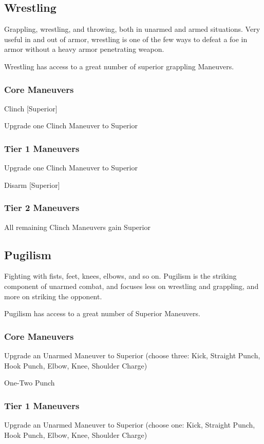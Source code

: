 \documentclass[oneside,11pt,english]{book}
\begin{document}
\subsection{Wrestling}
Grappling, wrestling, and throwing, both in unarmed and armed situations. Very useful in and out of 
armor, wrestling is one of the few ways to defeat a foe in armor without a heavy armor penetrating 
weapon.

Wrestling has access to a great number of superior grappling Maneuvers. 

\subsubsection{Core Maneuvers}
Clinch [Superior]

Upgrade one Clinch Maneuver to Superior

\subsubsection{Tier 1 Maneuvers}
Upgrade one Clinch Maneuver to Superior

Disarm [Superior]

\subsubsection{Tier 2 Maneuvers}
All remaining Clinch Maneuvers gain Superior 

\subsection{Pugilism}
Fighting with fists, feet, knees, elbows, and so on. Pugilism is the striking component of unarmed combat, 
and focuses less on wrestling and grappling, and more on striking the opponent. 

Pugilism has access to a great number of Superior Maneuvers. 

\subsubsection{Core Maneuvers}
Upgrade an Unarmed Maneuver to Superior (choose three: Kick, Straight Punch, Hook Punch, 
Elbow, Knee, Shoulder Charge) 

One-Two Punch

\subsubsection{Tier 1 Maneuvers}
Upgrade an Unarmed Maneuver to Superior (choose one: Kick, Straight Punch, Hook Punch, 
Elbow, Knee, Shoulder Charge) 
\end{document}
